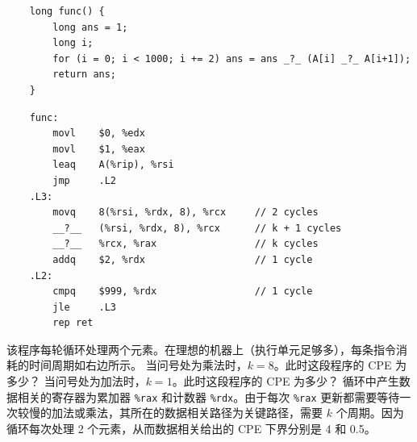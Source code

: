 \begin{problems}
        \begin{verbatim}
    long func() {
        long ans = 1;
        long i;
        for (i = 0; i < 1000; i += 2) ans = ans _?_ (A[i] _?_ A[i+1]);
        return ans;
    }
        \end{verbatim}
        \begin{verbatim}
    func:
        movl    $0, %edx
        movl    $1, %eax
        leaq    A(%rip), %rsi
        jmp     .L2
    .L3:
        movq    8(%rsi, %rdx, 8), %rcx     // 2 cycles
        __?__   (%rsi, %rdx, 8), %rcx      // k + 1 cycles
        __?__   %rcx, %rax                 // k cycles
        addq    $2, %rdx                   // 1 cycle
    .L2:
        cmpq    $999, %rdx                 // 1 cycle
        jle     .L3
        rep ret
        \end{verbatim}
        该程序每轮循环处理两个元素。在理想的机器上（执行单元足够多），每条指令消耗的时间周期如右边所示。
            \qn 当问号处为乘法时，$k=8$。此时这段程序的 CPE 为多少？
            \qn 当问号处为加法时，$k=1$。此时这段程序的 CPE 为多少？
        \sol 循环中产生数据相关的寄存器为累加器 \verb|%rax| 和计数器 \verb|%rdx|。由于每次 \verb|%rax| 更新都需要等待一次较慢的加法或乘法，其所在的数据相关路径为关键路径，需要 $k$ 个周期。因为循环每次处理 2 个元素，从而数据相关给出的 CPE 下界分别是 4 和 0.5。
    \end{problems}

